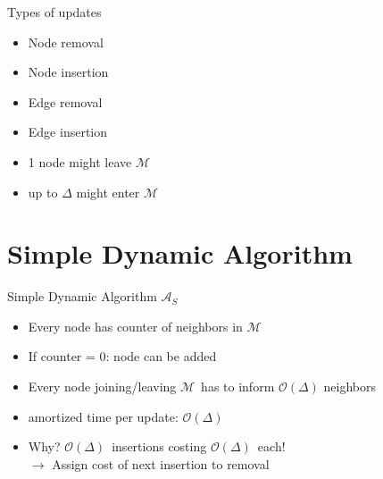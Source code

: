 \documentclass{beamer}
\newcommand{\simple}{$\mathcal{A}_S$}
\newcommand{\M}{$\mathcal{M}$}
\newcommand{\OD}{$\mathcal{O}(\Delta)$}
\begin{document}
\begin{frame}{Types of updates}
  \begin{itemize}
    \item Node removal
    \item Node insertion 
    \item Edge removal
    \item Edge insertion

    \bigskip
    \item 1 node might leave \M
    \item up to $\Delta$ might enter \M 
  \end{itemize}
  
\end{frame}


\section{Simple Dynamic Algorithm}
\begin{frame}{Simple Dynamic Algorithm \simple}
  \begin{itemize}
    \item Every node has counter of neighbors in \M
    \item If counter = 0: node can be added 
    \pause
    \medskip
    \item Every node joining/leaving \M\ has to inform $\mathcal{O}(\Delta)$ neighbors
    \medskip
    \item amortized time per update: \OD
    \pause
    \bigskip
    \item Why? \OD\ insertions costing \OD\ each!
    \\
    \pause
    $\rightarrow$ Assign cost of next insertion to removal
  \end{itemize}
  
\end{frame}
\end{document}
